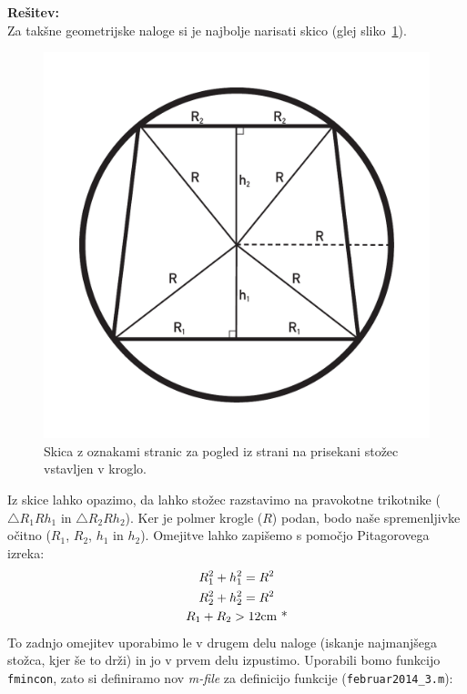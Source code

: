\documentclass[a4paper,11pt]{article}
\begin{document}
\vspace{5mm} 
\noindent \textbf{Rešitev:} \\
Za takšne geometrijske naloge si je najbolje narisati skico (glej sliko~\ref{img:februar2014_3_sketch}).  
\begin{figure}[hb]
	\centering	
	\includegraphics[scale=0.45]{images/februar2014_3_sketch.pdf}
	\caption{Skica z oznakami stranic za pogled iz strani na prisekani stožec vstavljen v kroglo.}
	\label{img:februar2014_3_sketch}
\end{figure}
Iz skice lahko opazimo, da lahko stožec razstavimo na pravokotne trikotnike ($\bigtriangleup R_1 R h_1$ in $\bigtriangleup R_2 R h_2$). Ker je polmer krogle ($R$) podan, bodo naše spremenljivke očitno ($R_1$, $R_2$, $h_1$ in $h_2$). Omejitve lahko zapišemo s pomočjo Pitagorovega izreka:
\begin{equation} \label{con:februar2014_3}
	\begin{gathered}
		R_1^2 + h_1^2 = R^2 \\
		R_2^2 + h_2^2 = R^2 \\
		R_1 + R_2 > 12\si{\cm} $ *$
	\end{gathered}
\end{equation}
To zadnjo omejitev uporabimo le v drugem delu naloge (iskanje najmanjšega stožca, kjer še to drži) in jo v prvem delu izpustimo. Uporabili bomo funkcijo \texttt{fmincon}, zato si definiramo nov \textit{m-file} za definicijo funkcije (\texttt{februar2014\_3.m}):
\end{document}
